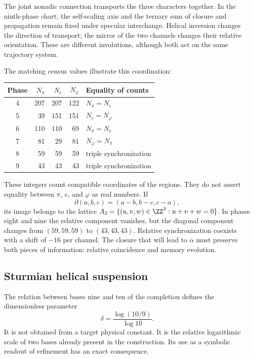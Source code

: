 The joint nonadic connection transports the three characters together. In the ninth-phase chart, the self-scaling axis and the ternary sum of closure and propagation remain fixed under specular interchange. Helical inversion changes the direction of transport; the mirror of the two channels changes their relative orientation. These are different involutions, although both act on the same trajectory system.

The matching census values illustrate this coordination:
\begin{center}
\begin{tabular}{@{}c rrr l@{}}\toprule
Phase&\(N_\pi\)&\(N_e\)&\(N_\varphi\)&Equality of counts\\\midrule
4&207&207&122&\(N_\pi=N_e\)\\
5&39&151&151&\(N_e=N_\varphi\)\\
6&110&110&69&\(N_\pi=N_e\)\\
7&81&29&81&\(N_\varphi=N_\pi\)\\
8&59&59&59&triple synchronization\\
9&43&43&43&triple synchronization\\\bottomrule
\end{tabular}
\end{center}
These integers count compatible coordinates of the regions. They do not assert equality between \(\pi\), \(e\), and \(\varphi\) as real numbers. If
\[
 \partial(a,b,c)=(a-b,b-c,c-a),
\]
its image belongs to the lattice \(A_2=\{(u,v,w)\in\ZZ^3:u+v+w=0\}\). In phases eight and nine the relative component vanishes, but the diagonal component changes from \((59,59,59)\) to \((43,43,43)\). Relative synchronization coexists with a shift of \(-16\) per channel. The closure that will lead to \(\alpha\) must preserve both pieces of information: relative coincidence and memory evolution.

\subsection{Sturmian helical suspension}

The relation between bases nine and ten of the completion defines the dimensionless parameter
\begin{equation}
 \delta=\frac{\log(10/9)}{\log10}.
 \label{eq:delta-sturm}
\end{equation}
It is not obtained from a target physical constant. It is the relative logarithmic scale of two bases already present in the construction. Its use as a symbolic readout of refinement has an exact consequence.

